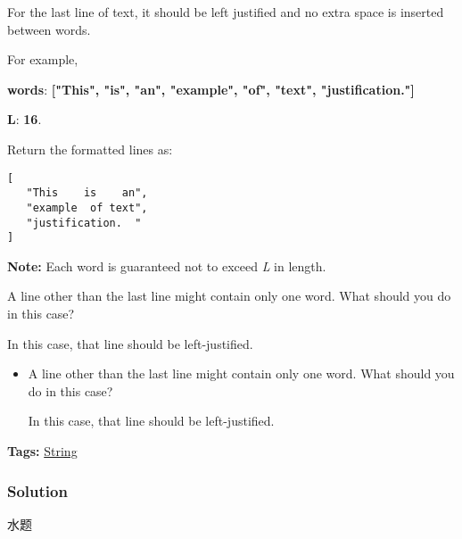 \documentclass{article}
\begin{document}
\begin{CJK*}{UTF8}{gkai}
For the last line of text, it should be left justified and no extra space is inserted between words.

For example,


\textbf{words}: \textbf{["This", "is", "an", "example", "of", "text", "justification."]}


\textbf{L}: \textbf{16}.

Return the formatted lines as:


\begin{verbatim}
[
   "This    is    an",
   "example  of text",
   "justification.  "
]
\end{verbatim}

\textbf{Note:} Each word is guaranteed not to exceed \emph{L} in length.

A line other than the last line might contain only one word. What should you do in this case?


In this case, that line should be left-justified.
\begin{itemize}
\item A line other than the last line might contain only one word. What should you do in this case?


In this case, that line should be left-justified.
\end{itemize}


\textbf{Tags: }
\hyperref[ String ]{ String }



\subsubsection*{Solution}
水题


\end{CJK*}
\end{document}
